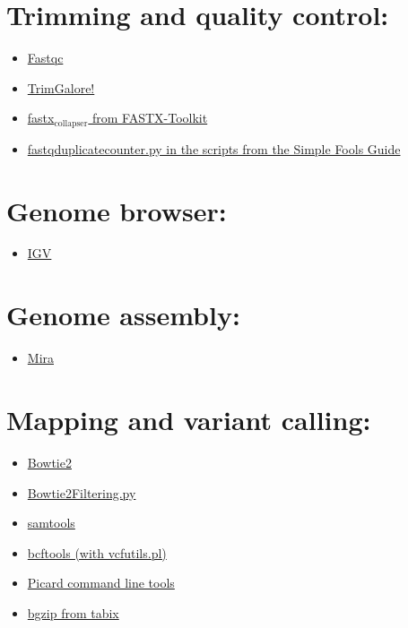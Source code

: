 \documentclass[11pt]{article}
\begin{document}
\section*{Trimming and quality control:}
\label{unnumbered-2}
\begin{itemize}
\item \href{http://www.bioinformatics.babraham.ac.uk/projects/fastqc/}{Fastqc}
\item \href{http://www.bioinformatics.babraham.ac.uk/projects/trim_galore/}{TrimGalore!}
\item \href{http://hannonlab.cshl.edu/fastx_toolkit/commandline.html}{fastx\(_{\text{collapser}}\) from FASTX-Toolkit}
\item \href{http://sfg.stanford.edu/scripts.html}{fastqduplicatecounter.py in the scripts from the Simple Fools Guide}
\end{itemize}

\section*{Genome browser:}
\label{unnumbered-3}
\begin{itemize}
\item \href{https://www.broadinstitute.org/igv/}{IGV}
\end{itemize}

\section*{Genome assembly:}
\label{unnumbered-4}
\begin{itemize}
\item \href{http://mira-assembler.sourceforge.net/}{Mira}
\end{itemize}

\section*{Mapping and variant calling:}
\label{unnumbered-5}
\begin{itemize}
\item \href{http://bowtie-bio.sourceforge.net/bowtie2/index.shtml}{Bowtie2}
\item \href{http://marinetics.org/2015/03/03/Bowtie2Filtering.html}{Bowtie2Filtering.py}
\item \href{http://www.htslib.org/}{samtools}
\item \href{http://www.htslib.org/}{bcftools (with vcfutils.pl)}
\item \href{https://broadinstitute.github.io/picard/command-line-overview.html}{Picard command line tools}
\item \href{http://samtools.sourceforge.net/tabix.shtml}{bgzip from tabix}
\end{itemize}
\end{document}
